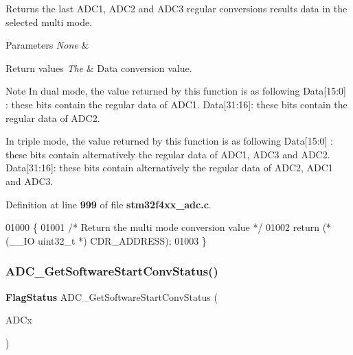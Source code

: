 Returns the last A\+D\+C1, A\+D\+C2 and A\+D\+C3 regular conversions results data in the selected multi mode. 


\begin{DoxyParams}{Parameters}
{\em None} & \\
\hline
\end{DoxyParams}

\begin{DoxyRetVals}{Return values}
{\em The} & Data conversion value. \\
\hline
\end{DoxyRetVals}
\begin{DoxyNote}{Note}
In dual mode, the value returned by this function is as following Data[15\+:0] \+: these bits contain the regular data of A\+D\+C1. Data[31\+:16]\+: these bits contain the regular data of A\+D\+C2. 

In triple mode, the value returned by this function is as following Data[15\+:0] \+: these bits contain alternatively the regular data of A\+D\+C1, A\+D\+C3 and A\+D\+C2. Data[31\+:16]\+: these bits contain alternatively the regular data of A\+D\+C2, A\+D\+C1 and A\+D\+C3. 
\end{DoxyNote}


Definition at line \textbf{ 999} of file \textbf{ stm32f4xx\+\_\+adc.\+c}.


\begin{DoxyCode}
01000 \{
01001   \textcolor{comment}{/* Return the multi mode conversion value */}
01002   \textcolor{keywordflow}{return} (*(\_\_IO uint32\_t *) CDR_ADDRESS);
01003 \}
\end{DoxyCode}
\mbox{\label{group__ADC__Group4_gaf1119583782ecbcec380efcb7eb74883}} 
\subsubsection{A\+D\+C\+\_\+\+Get\+Software\+Start\+Conv\+Status()}
{\footnotesize\ttfamily \textbf{ Flag\+Status} A\+D\+C\+\_\+\+Get\+Software\+Start\+Conv\+Status (\begin{DoxyParamCaption}\item[{\textbf{ A\+D\+C\+\_\+\+Type\+Def} $\ast$}]{A\+D\+Cx }\end{DoxyParamCaption})}



